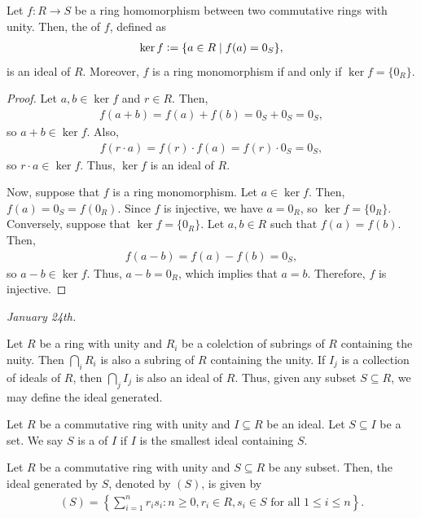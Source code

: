\begin{proposition}
    Let $f:R \to S$ be a ring homomorphism between two commutative rings with unity. Then, the  of $f$, defined as
    \begin{align}
        \ker f \vcentcolon= \{a \in R \mid f(a) = 0_{S}\},
    \end{align}
    is an ideal of $R$. Moreover, $f$ is a ring monomorphism if and only if $\ker f = \{0_{R}\}$.
\end{proposition}
\begin{proof}
    Let $a, b \in \ker f$ and $r \in R$. Then,
    \begin{align}
        f(a + b) = f(a) + f(b) = 0_{S} + 0_{S} = 0_{S},
    \end{align}
    so $a + b \in \ker f$. Also,
    \begin{align}
        f(r \cdot a) = f(r) \cdot f(a) = f(r) \cdot 0_{S} = 0_{S},
    \end{align}
    so $r \cdot a \in \ker f$. Thus, $\ker f$ is an ideal of $R$.

    Now, suppose that $f$ is a ring monomorphism. Let $a \in \ker f$. Then, $f(a) = 0_{S} = f(0_{R})$. Since $f$ is injective, we have $a = 0_{R}$, so $\ker f = \{0_{R}\}$. Conversely, suppose that $\ker f = \{0_{R}\}$. Let $a, b \in R$ such that $f(a) = f(b)$. Then,
    \begin{align}
        f(a - b) = f(a) - f(b) = 0_{S},
    \end{align}
    so $a - b \in \ker f$. Thus, $a - b = 0_{R}$, which implies that $a = b$. Therefore, $f$ is injective.
\end{proof}

\noindent \textit{January 24th.}

Let $R$ be a ring with unity and $R_{i}$ be a colelction of subrings of $R$ containing the nuity. Then $\bigcap_{i} R_{i}$ is also a subring of $R$ containing the unity. If $I_{j}$ is a collection of ideals of $R$, then $\bigcap_{j} I_{j}$ is also an ideal of $R$. Thus, given any subset $S \subseteq R$, we may define the ideal generated.

\begin{definition}
    Let $R$ be a commutative ring with unity and $I \subseteq R$ be an ideal. Let $S \subseteq I$ be a set. We say $S$ is a  of $I$ if $I$ is the smallest ideal containing $S$.
\end{definition}

\begin{proposition}
    Let $R$ be a commutative ring with unity and $S \subseteq R$ be any subset. Then, the ideal generated by $S$, denoted by $(S)$, is given by
    \begin{align}
        (S) = \left\{ \sum_{i=1}^{n} r_{i} s_{i} : n \geq 0, r_{i} \in R, s_{i} \in S \text{ for all } 1 \leq i \leq n \right\}.
    \end{align}
\end{proposition}


